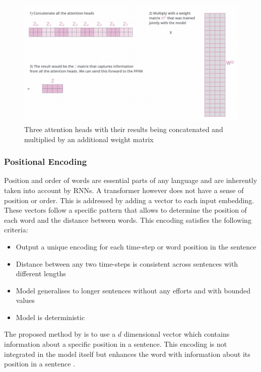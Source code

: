 \documentclass[11pt]{article}
\begin{document}
\begin{figure}[htb]
	\centering
	\includegraphics[width=0.8\linewidth]{img/transformer_attention_head}
	\caption{Three attention heads with their results being concatenated and multiplied by an additional weight matrix}
	\label{fig:transformerattentionhead}
\end{figure}

\subsubsection{Positional Encoding}
Position and order of words are essential parts of any language and are inherently taken into account by RNNs. A transformer however does not have a sense of position or order. This is addressed by adding a vector to each input embedding. These vectors follow a specific pattern that allows to determine the position of each word and the distance between words. This encoding satisfies the following criteria:
\begin{itemize}
	\item Output a unique encoding for each time-step or word position in the sentence
	\item Distance between any two time-steps is consistent across sentences with different lengths
	\item Model generalises to longer sentences without any efforts and with bounded values
	\item Model is deterministic
\end{itemize}
The proposed method by \citeauthor{vaswani2017attention} is to use a $d$ dimensional vector which contains information about a specific position in a sentence. This encoding is not integrated in the model itself but enhances the word with information about its position in a sentence \footnotemark.

\end{document}
